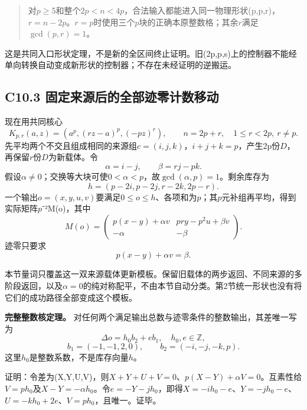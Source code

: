 \begin{quote}
{对\ensuremath{p}\ensuremath{\ge}5和整个\ensuremath{2p<n<4p}，合法输入都能进入同一物理形状(p,p,r)，\ensuremath{r=n-2p}。\ensuremath{r=p}时使用三个\ensuremath{p}块的正确本原整数格；其余\ensuremath{r}满足\ensuremath{\operatorname{gcd}(p,r)=1}。}
\end{quote}

{这是共同入口形状定理，不是新的全区间终止证明。旧(2p,p,s)上的控制器不能经单向转换自动变成新形状的控制器；不存在未经证明的逆搬运。}

\subsection*{\texorpdfstring{{C10.3} {固定来源后的全部迹零计数移动}}{C10.3 固定来源后的全部迹零计数移动}}\label{C10-h75}

{现在用共同核心} \[
K_{p,r}(a,z)=(a^p,(rz-a)^p,(-pz)^r),\qquad n=2p+r,
\quad 1\le r<2p,\ r\ne p.
\] {先平均两个不交且组成相同的来源组\ensuremath{c=(i,j,k)}，\ensuremath{i+j+k=p}，产生2p份\ensuremath{D}，再保留\ensuremath{r}份\ensuremath{D}为新载体。令} \[
\alpha=i-j,\qquad \beta=rj-pk.
\] {假设\ensuremath{\alpha }\ensuremath{\ne}0；交换等大块可使\ensuremath{0<\alpha <p}，故\ensuremath{\operatorname{gcd}(\alpha ,p)=1}。剩余库存为} \[
h=(p-2i,p-2j,r-2k,2p-r).
\tag{C10.3.1}
\] {一个输出\ensuremath{o=(x,y,u,v)}要满足0\ensuremath{\le}\ensuremath{o}\ensuremath{\le}\ensuremath{h}、各项和为\ensuremath{p}；其\ensuremath{p}元补组再平均，得到实际矩阵\ensuremath{p}⁻²M(o)，其中} \[
M(o)=\begin{pmatrix}
p(x-y)+\alpha v&pry-p^2u+\beta v\\
-\alpha&-\beta
\end{pmatrix}.
\tag{C10.3.2}
\] {迹零只要求} \[
p(x-y)+\alpha v=\beta.
\tag{C10.3.3}
\]

{本节量词只覆盖这一双来源载体更新模板。保留旧载体的两步返回、不同来源的多阶段返回，以及\ensuremath{\alpha =0}的纯对称配平，不由本节自动分类。第2节统一形状也没有将它们的成功路径全部变成这个模板。}

\textbf{{完整整数核定理。}} {对任何两个满足输出总数与迹零条件的整数输出，其差唯一写为} \[
\boxed{\Delta o=h_0b_2+e b_1,\quad h_0,e\in\mathbb Z,}
\] \[
\boxed{b_1=(-1,-1,2,0),\qquad b_2=(-i,-j,-k,p).}
\tag{C10.3.4}
\] {这里\ensuremath{h_{0}}是整数系数，不是库存向量\ensuremath{h}。}

{证明：令差为(X,Y,U,V)，则\ensuremath{X+Y+U+V=0}、\ensuremath{p(X-Y)+\alpha V=0}。互素性给\ensuremath{V=ph_{0}}及\ensuremath{X-Y=-\alpha h_{0}}。令\ensuremath{e=-Y-jh_{0}}，即得\ensuremath{X=-ih_{0}-e}、\ensuremath{Y=-jh_{0}-e}、\ensuremath{U=-kh_{0}+2e}、\ensuremath{V=ph_{0}}，且唯一。证毕。}

